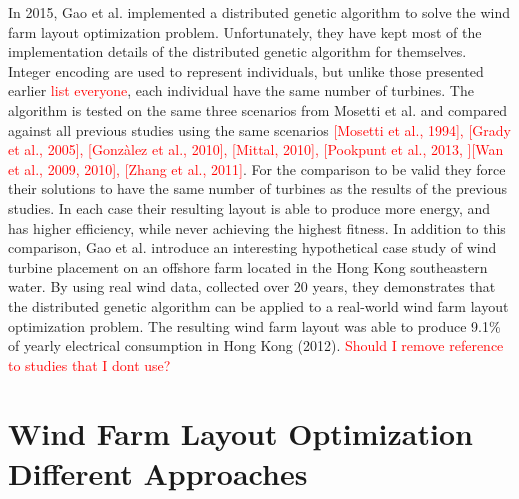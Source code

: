 \noindent In 2015, Gao et al. implemented a distributed genetic algorithm to solve the wind farm layout optimization problem. Unfortunately, they have kept most of the implementation details of the distributed genetic algorithm for themselves. Integer encoding are used to represent individuals, but unlike those presented earlier \textcolor{red}{list everyone}, each individual have the same number of turbines. The algorithm is tested on the same three scenarios from Mosetti et al. and compared against all previous studies using the same scenarios \textcolor{red}{[Mosetti et al., 1994], [Grady et al., 2005], [Gonzàlez et al., 2010], [Mittal, 2010], [Pookpunt et al., 2013, ][Wan et al., 2009, 2010], [Zhang et al., 2011]}. For the comparison to be valid they force their solutions to have the same number of turbines as the results of the previous studies. In each case their resulting layout is able to produce more energy, and has higher efficiency, while never achieving the highest fitness. In addition to this comparison, Gao et al. introduce an interesting hypothetical case study of wind turbine placement on an offshore farm located in the Hong Kong southeastern water. By using real wind data, collected over 20 years, they demonstrates that the distributed genetic algorithm can be applied to a real-world wind farm layout optimization problem. The resulting wind farm layout was able to produce 9.1\% of yearly electrical consumption in Hong Kong (2012). \textcolor{red}{Should I remove reference to studies that I dont use?}


\section{Wind Farm Layout Optimization Different Approaches}


